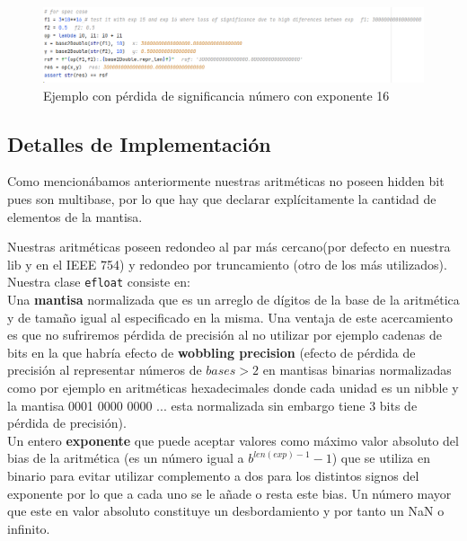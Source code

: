 \documentclass[a4paper,10pt,twocolumn]{article}
\begin{document}
\begin{figure}[H]
	\centering
	\includegraphics[width=0.9\linewidth]{res/sigloss1}
	\caption{Ejemplo con pérdida de significancia número con exponente 16}
	\label{fig:sigloss1}
\end{figure}




	\twocolumn
	\subsection{Detalles de Implementación}
	
	Como mencionábamos anteriormente nuestras aritméticas no poseen hidden bit pues son multibase, por lo que hay que declarar explícitamente la cantidad de elementos de la mantisa.
	
	Nuestras aritméticas poseen redondeo al par más cercano(por defecto en nuestra lib y en el IEEE 754) y redondeo por truncamiento (otro de los más utilizados).\\
	
	Nuestra clase \texttt{efloat}  consiste en: \\
	
	Una \textbf{mantisa} normalizada que es un arreglo de dígitos de la base de la aritmética y de tamaño igual al especificado en la misma. Una ventaja de este acercamiento es que no sufriremos pérdida de precisión al no utilizar por ejemplo cadenas de bits en la que habría efecto de \textbf{wobbling precision} (efecto de pérdida de precisión al representar números de $bases > 2$ en mantisas binarias normalizadas como por ejemplo en aritméticas hexadecimales donde cada unidad es un nibble y la mantisa 0001 0000 0000 ... esta normalizada sin embargo tiene 3 bits de pérdida de precisión).\\
	
	Un entero \textbf{exponente} que puede aceptar valores como máximo valor absoluto del bias de la aritmética (es un número igual a $b^{len(exp)-1}-1$) que se utiliza en binario para evitar utilizar complemento a dos para los distintos signos del exponente por lo que a cada uno se le añade o resta este bias. Un número mayor que este en valor absoluto constituye un desbordamiento y por tanto un NaN o infinito.\\
	
\end{document}
